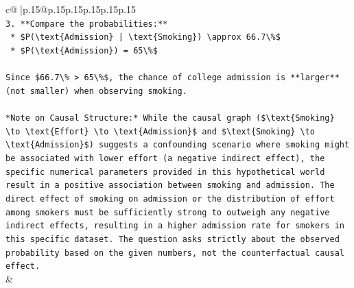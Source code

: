 \documentclass{article}
\begin{document}
{\begin{supertabular}{c@{$\;$}|p{.15\linewidth}@{}p{.15\linewidth}p{.15\linewidth}p{.15\linewidth}p{.15\linewidth}p{.15\linewidth}}
{{{\\ 
\texttt{3.  **Compare the probabilities:**} \\
\texttt{    *   \$P(\textbackslash{}text\{Admission\} | \textbackslash{}text\{Smoking\}) \textbackslash{}approx 66.7\textbackslash{}\%\$} \\
\texttt{    *   \$P(\textbackslash{}text\{Admission\}) = 65\textbackslash{}\%\$} \\
\\ 
\texttt{Since \$66.7\textbackslash{}\% > 65\textbackslash{}\%\$, the chance of college admission is **larger** (not smaller) when observing smoking.} \\
\\ 
\texttt{*Note on Causal Structure:* While the causal graph (\$\textbackslash{}text\{Smoking\} \textbackslash{}to \textbackslash{}text\{Effort\} \textbackslash{}to \textbackslash{}text\{Admission\}\$ and \$\textbackslash{}text\{Smoking\} \textbackslash{}to \textbackslash{}text\{Admission\}\$) suggests a confounding scenario where smoking might be associated with lower effort (a negative indirect effect), the specific numerical parameters provided in this hypothetical world result in a positive association between smoking and admission. The direct effect of smoking on admission or the distribution of effort among smokers must be sufficiently strong to outweigh any negative indirect effects, resulting in a higher admission rate for smokers in this specific dataset. The question asks strictly about the observed probability based on the given numbers, not the counterfactual causal effect.} \\
            }
        }
    }
    & \\ \\


\end{supertabular}}
\end{document}

